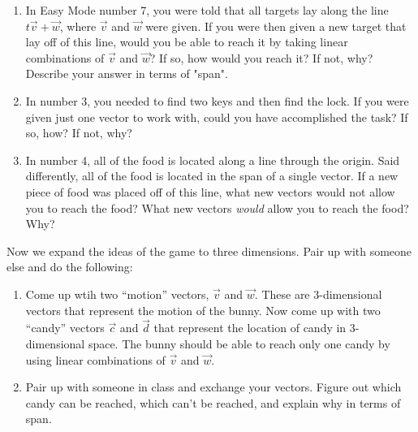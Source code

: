 \documentclass{ximera}
\begin{document}
  \begin{exploration}
    
  \begin{enumerate}

    \item In Easy Mode number 7, you were told that all targets lay along the line $t\vec{v}+\vec{w}$, where $\vec{v}$ and $\vec{w}$ were given. If you were then given a new target that lay off of this line, would you be able to reach it by taking linear combinations of $\vec{v}$ and $\vec{w}$? If so, how would you reach it? If not, why? Describe your answer in terms of "span".
    
    \item In number 3, you needed to find two keys and then find the lock. If you were given just one vector to work with, could you have accomplished the task? If so, how? If not, why?
    
    \item In number 4, all of the food is located along a line through the origin. Said differently, all of the food is located in the span of a single vector. If a new piece of food was placed off of this line, what new vectors would not allow you to reach the food? What new vectors \emph{would} allow you to reach the food? Why?

  \end{enumerate}

\end{exploration}

\begin{exploration}

  Now we expand the ideas of the game to three dimensions. Pair up with someone else and do the following:

  \begin{enumerate}
  
    \item Come up wtih two ``motion'' vectors, $\vec{v}$ and $\vec{w}$. These are $3$-dimensional vectors that represent the motion of the bunny. Now come up with two ``candy'' vectors $\vec{c}$ and $\vec{d}$ that represent the location of candy in $3$-dimensional space. The bunny should be able to reach only one candy by using linear combinations of $\vec{v}$ and $\vec{w}$.
    \item Pair up with someone in class and exchange your vectors. Figure out which candy can be reached, which can't be reached, and explain why in terms of span.

  \end{enumerate}

\end{exploration}
\end{document}
